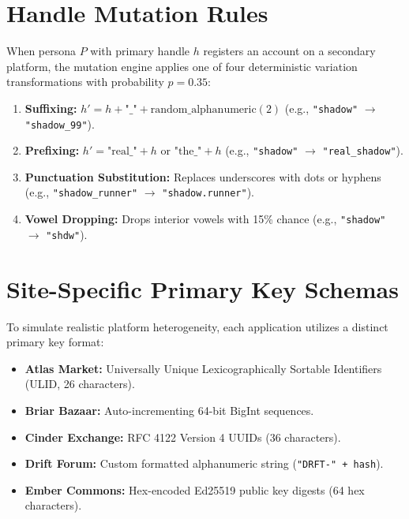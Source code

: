 \section{Handle Mutation Rules}
When persona $P$ with primary handle $h$ registers an account on a secondary platform, the mutation engine applies one of four deterministic variation transformations with probability $p = 0.35$:
\begin{enumerate}
    \item \textbf{Suffixing:} $h' = h + \text{"\_"} + \text{random\_alphanumeric}(2)$ (e.g., \texttt{"shadow"} $\to$ \texttt{"shadow\_99"}).
    \item \textbf{Prefixing:} $h' = \text{"real\_"} + h$ or $\text{"the\_"} + h$ (e.g., \texttt{"shadow"} $\to$ \texttt{"real\_shadow"}).
    \item \textbf{Punctuation Substitution:} Replaces underscores with dots or hyphens (e.g., \texttt{"shadow\_runner"} $\to$ \texttt{"shadow.runner"}).
    \item \textbf{Vowel Dropping:} Drops interior vowels with 15\% chance (e.g., \texttt{"shadow"} $\to$ \texttt{"shdw"}).
\end{enumerate}

\section{Site-Specific Primary Key Schemas}
To simulate realistic platform heterogeneity, each application utilizes a distinct primary key format:
\begin{itemize}
    \item \textbf{Atlas Market:} Universally Unique Lexicographically Sortable Identifiers (ULID, 26 characters).
    \item \textbf{Briar Bazaar:} Auto-incrementing 64-bit BigInt sequences.
    \item \textbf{Cinder Exchange:} RFC 4122 Version 4 UUIDs (36 characters).
    \item \textbf{Drift Forum:} Custom formatted alphanumeric string (\texttt{"DRFT-" + hash}).
    \item \textbf{Ember Commons:} Hex-encoded Ed25519 public key digests (64 hex characters).
\end{itemize}
